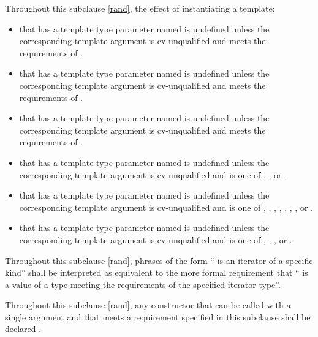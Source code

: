 \pnum
Throughout this subclause \ref{rand},
the effect of instantiating a template:
\begin{itemize}
  \item
    that has a template type parameter
    named 
    is undefined unless the corresponding template argument
    is cv-unqualified and
    meets the requirements
    of .
  \item
    that has a template type parameter
    named 
    is undefined unless the corresponding template argument
    is cv-unqualified and
    meets the requirements
    of .
  \item
    that has a template type parameter
    named 
    is undefined unless the corresponding template argument
    is cv-unqualified and
    meets the requirements
    of .
  \item
    that has a template type parameter
    named 
    is undefined unless the corresponding template argument
    is cv-unqualified and
    is one of
    , , or .
  \item
    that has a template type parameter
    named 
    is undefined unless the corresponding template argument
    is cv-unqualified and
    is one of
      ,
      ,
      ,
      ,
      ,
      ,
      ,
      or
      .
  \item
    that has a template type parameter
    named 
    is undefined unless the corresponding template argument
    is cv-unqualified and
    is one of
      ,
      ,
      ,
      or
      .
\end{itemize}

\pnum
Throughout this subclause \ref{rand},
phrases of the form `` is an iterator of a specific kind''
shall be interpreted as equivalent to the more formal requirement that
`` is a value
of a type meeting the requirements
of the specified iterator type''.

\pnum
Throughout this subclause \ref{rand},
any constructor that can be called with a single argument
and that meets a requirement specified in this subclause
shall be declared .

